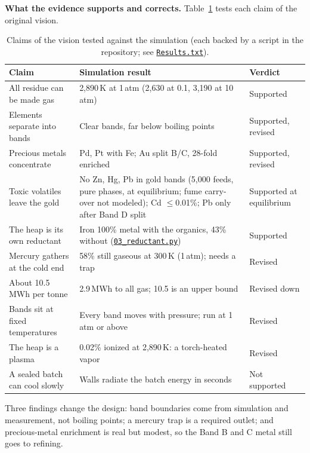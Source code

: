 \documentclass[11pt,a4paper]{article}
\newcommand{\gh}[2]{\href{https://github.com/syncaissa/paramanu-reclaimer/blob/main/#1}{\texttt{#2}}}
\theoremstyle{definition}
\theoremstyle{plain}
\theoremstyle{remark}
\begin{document}
\textbf{What the evidence supports and corrects.} Table~\ref{tab:verdict} tests each claim of the original vision.

\begin{table}[!htbp]
\centering
\caption{Claims of the vision tested against the simulation (each backed by a script in the repository; see \gh{Results.txt}{Results.txt}).}\label{tab:verdict}
\footnotesize
\begin{tabular}{@{}p{4.2cm}p{7.6cm}p{1.9cm}@{}}
\toprule
\textbf{Claim} & \textbf{Simulation result} & \textbf{Verdict} \\
\midrule
All residue can be made gas & 2,890\,K at 1\,atm (2,630 at 0.1, 3,190 at 10\,atm) & Supported \\
Elements separate into bands & Clear bands, far below boiling points & Supported, revised \\
Precious metals concentrate & Pd, Pt with Fe; Au split B/C, 28-fold enriched & Supported, revised \\
Toxic volatiles leave the gold & No Zn, Hg, Pb in gold bands (5,000 feeds, pure phases, at equilibrium; fume carry-over not modeled); Cd $\le$0.01\%; Pb only after Band D split & Supported at equilibrium \\
The heap is its own reductant & Iron 100\% metal with the organics, 43\% without (\gh{simulation/scripts/03_reductant.py}{03\_reductant.py}) & Supported \\
Mercury gathers at the cold end & 58\% still gaseous at 300\,K (1\,atm); needs a trap & Revised \\
About 10.5\,MWh per tonne & 2.9\,MWh to all gas; 10.5 is an upper bound & Revised down \\
Bands sit at fixed temperatures & Every band moves with pressure; run at 1\,atm or above & Revised \\
The heap is a plasma & 0.02\% ionized at 2,890\,K: a torch-heated vapor & Revised \\
A sealed batch can cool slowly & Walls radiate the batch energy in seconds & Not supported \\
\bottomrule
\end{tabular}
\end{table}

Three findings change the design: band boundaries come from simulation and measurement, not boiling points; a mercury trap is a required outlet; and precious-metal enrichment is real but modest, so the Band B and C metal still goes to refining.
\end{document}
